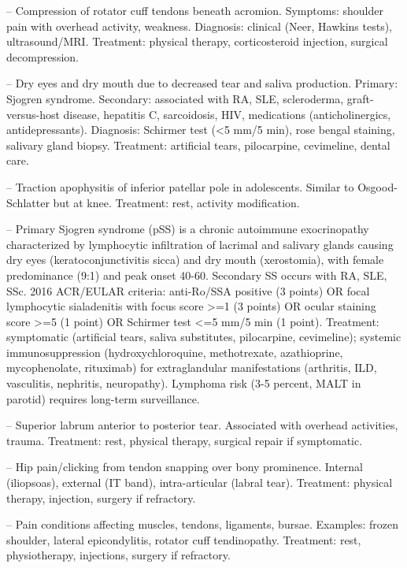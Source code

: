-- Compression of rotator cuff tendons beneath acromion. Symptoms: shoulder pain with overhead activity, weakness. Diagnosis: clinical (Neer, Hawkins tests), ultrasound/MRI. Treatment: physical therapy, corticosteroid injection, surgical decompression.

-- Dry eyes and dry mouth due to decreased tear and saliva production. Primary: Sjogren syndrome. Secondary: associated with RA, SLE, scleroderma, graft-versus-host disease, hepatitis C, sarcoidosis, HIV, medications (anticholinergics, antidepressants). Diagnosis: Schirmer test (<5 mm/5 min), rose bengal staining, salivary gland biopsy. Treatment: artificial tears, pilocarpine, cevimeline, dental care.

-- Traction apophysitis of inferior patellar pole in adolescents. Similar to Osgood-Schlatter but at knee. Treatment: rest, activity modification.

-- Primary Sjogren syndrome (pSS) is a chronic autoimmune exocrinopathy characterized by lymphocytic infiltration of lacrimal and salivary glands causing dry eyes (keratoconjunctivitis sicca) and dry mouth (xerostomia), with female predominance (9:1) and peak onset 40-60. Secondary SS occurs with RA, SLE, SSc. 2016 ACR/EULAR criteria: anti-Ro/SSA positive (3 points) OR focal lymphocytic sialadenitis with focus score >=1 (3 points) OR ocular staining score >=5 (1 point) OR Schirmer test <=5 mm/5 min (1 point). Treatment: symptomatic (artificial tears, saliva substitutes, pilocarpine, cevimeline); systemic immunosuppression (hydroxychloroquine, methotrexate, azathioprine, mycophenolate, rituximab) for extraglandular manifestations (arthritis, ILD, vasculitis, nephritis, neuropathy). Lymphoma risk (3-5 percent, MALT in parotid) requires long-term surveillance.

-- Superior labrum anterior to posterior tear. Associated with overhead activities, trauma. Treatment: rest, physical therapy, surgical repair if symptomatic.

-- Hip pain/clicking from tendon snapping over bony prominence. Internal (iliopsoas), external (IT band), intra-articular (labral tear). Treatment: physical therapy, injection, surgery if refractory.

-- Pain conditions affecting muscles, tendons, ligaments, bursae. Examples: frozen shoulder, lateral epicondylitis, rotator cuff tendinopathy. Treatment: rest, physiotherapy, injections, surgery if refractory.

